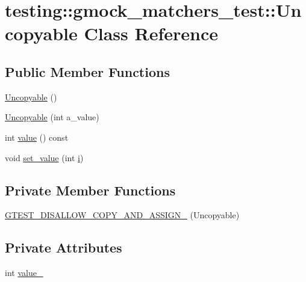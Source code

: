\hypertarget{classtesting_1_1gmock__matchers__test_1_1_uncopyable}{}\section{testing\+::gmock\+\_\+matchers\+\_\+test\+::Uncopyable Class Reference}
\label{classtesting_1_1gmock__matchers__test_1_1_uncopyable}
\subsection*{Public Member Functions}
\begin{DoxyCompactItemize}
\item 
\mbox{\hyperlink{classtesting_1_1gmock__matchers__test_1_1_uncopyable_a29cd3836f686c1e9c47e5e0f98c56b13}{Uncopyable}} ()
\item 
\mbox{\hyperlink{classtesting_1_1gmock__matchers__test_1_1_uncopyable_a827c1de4fe4c2e40791dd87a13972bc7}{Uncopyable}} (int a\+\_\+value)
\item 
int \mbox{\hyperlink{classtesting_1_1gmock__matchers__test_1_1_uncopyable_a23512131b948e40ded06555848829866}{value}} () const
\item 
void \mbox{\hyperlink{classtesting_1_1gmock__matchers__test_1_1_uncopyable_a3f30b54f22caac3aa7e6fb79012dc52f}{set\+\_\+value}} (int \mbox{\hyperlink{_obj__test_2lib_2googletest-master_2googlemock_2test_2gmock-matchers__test_8cc_acb559820d9ca11295b4500f179ef6392}{i}})
\end{DoxyCompactItemize}
\subsection*{Private Member Functions}
\begin{DoxyCompactItemize}
\item 
\mbox{\hyperlink{classtesting_1_1gmock__matchers__test_1_1_uncopyable_a072af27a669fd6683532825cf7ef89d7}{G\+T\+E\+S\+T\+\_\+\+D\+I\+S\+A\+L\+L\+O\+W\+\_\+\+C\+O\+P\+Y\+\_\+\+A\+N\+D\+\_\+\+A\+S\+S\+I\+G\+N\+\_\+}} (Uncopyable)
\end{DoxyCompactItemize}
\subsection*{Private Attributes}
\begin{DoxyCompactItemize}
\item 
int \mbox{\hyperlink{classtesting_1_1gmock__matchers__test_1_1_uncopyable_a553a826c5f4aea0a52da8b2769d24faa}{value\+\_\+}}
\end{DoxyCompactItemize}


